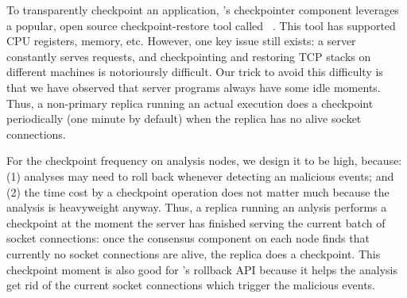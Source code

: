 To transparently checkpoint an application, \xxx's checkpointer component 
leverages a popular, open source checkpoint-restore tool called 
\criu~\cite{criu}. This tool has supported CPU registers, memory, etc. However, 
one key issue still exists: a server constantly serves requests, and 
checkpointing and restoring TCP stacks on different machines is notorioursly 
difficult. Our trick to avoid this difficulty is that we have observed that 
server programs always have some idle moments. Thus, a \xxx non-primary replica 
running an actual execution does a checkpoint periodically (one minute by 
default) when the replica has no alive socket connections.

For the checkpoint frequency on analysis nodes, we design it to be high, 
because: (1) analyses may need to roll back whenever detecting an malicious 
events; and (2) the time cost by a checkpoint operation does not matter much 
because the analysis is heavyweight anyway. Thus, a \xxx replica running an 
anlysis performs a checkpoint at the moment the server has finished serving 
the current batch of socket connections: once the \paxos consensus component on 
each node finds that currently no socket connections are alive, the replica 
does a checkpoint. This checkpoint moment is also good for \xxx's rollback API 
because it helps the analysis get rid of the current socket connections which 
trigger the malicious events. 


